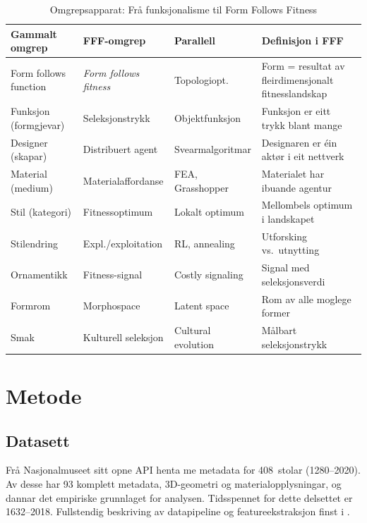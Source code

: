 \documentclass[12pt,a4paper]{article}
\begin{document}
\begin{table}[H]
\centering
\caption{Omgrepsapparat: Fr\aa{} funksjonalisme til Form Follows Fitness}
\label{tab:omgrep}
\small
\begin{tabularx}{\textwidth}{p{3cm}p{2.8cm}p{2.8cm}X}
\toprule
\textbf{Gammalt omgrep} & \textbf{FFF-omgrep} & \textbf{Parallell} & \textbf{Definisjon i FFF} \\
\midrule
Form follows function & \emph{Form follows fitness} & Topologiopt. & Form = resultat av fleirdimensjonalt fitnesslandskap \\
Funksjon (formgjevar) & Seleksjonstrykk & Objektfunksjon & Funksjon er eitt trykk blant mange \\
Designer (skapar) & Distribuert agent & Svearmalgoritmar & Designaren er \'{e}in akt\o{}r i eit nettverk \\
Material (medium) & Materialaffordanse & FEA, Grasshopper & Materialet har ibuande agentur \\
Stil (kategori) & Fitnessoptimum & Lokalt optimum & Mellombels optimum i landskapet \\
Stilendring & Expl./exploitation & RL, annealing & Utforsking vs.\ utnytting \\
Ornamentikk & Fitness-signal & Costly signaling & Signal med seleksjonsverdi \\
Formrom & Morphospace & Latent space & Rom av alle moglege former \\
Smak & Kulturell seleksjon & Cultural evolution & M\aa{}lbart seleksjonstrykk \\
\bottomrule
\end{tabularx}
\end{table}

\section{Metode}
\label{sec:metode}

\subsection{Datasett}

Fr\aa{} Nasjonalmuseet sitt opne API henta me metadata for 408~stolar (1280--2020). Av desse har 93 komplett metadata, 3D-geometri og materialopplysningar, og dannar det empiriske grunnlaget for analysen. Tidsspennet for dette delsettet er 1632--2018. Fullstendig beskriving av datapipeline og featureekstraksjon finst i \citet{finne2026c}.
\end{document}
